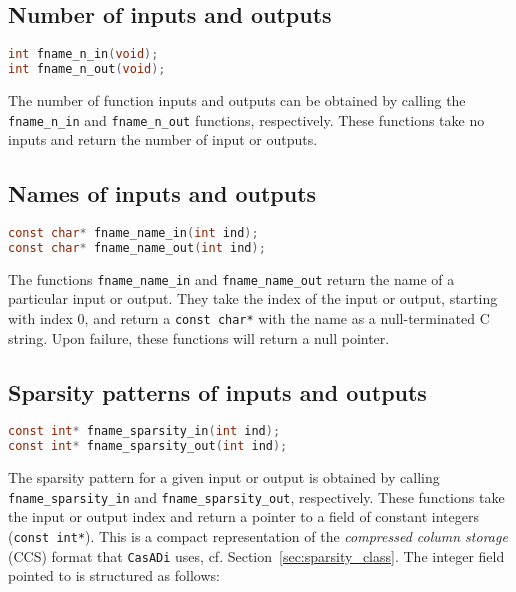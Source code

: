 \documentclass[a4paper,12pt]{book}
\newcommand{\CasADi}{\texttt{CasADi}\xspace}
\begin{document}
\subsection*{Number of inputs and outputs}
\begin{lstlisting}[language=C]
int fname_n_in(void);
int fname_n_out(void);
\end{lstlisting}

The number of function inputs and outputs can be obtained by calling the
\verb|fname_n_in| and \verb|fname_n_out| functions, respectively. These functions
take no inputs and return the number of input or outputs.

\subsection*{Names of inputs and outputs}
\begin{lstlisting}[language=C]
const char* fname_name_in(int ind);
const char* fname_name_out(int ind);
\end{lstlisting}

The functions \verb|fname_name_in| and \verb|fname_name_out| return the name
of a particular input or output. They take the index of the input or output,
starting with index 0, and return a \verb|const char*| with the name as a
null-terminated C string. Upon failure, these functions will return a null
pointer.

\subsection*{Sparsity patterns of inputs and outputs}
\begin{lstlisting}[language=C]
const int* fname_sparsity_in(int ind);
const int* fname_sparsity_out(int ind);
\end{lstlisting}

The sparsity pattern for a given input or output is obtained by calling
\verb|fname_sparsity_in| and \verb|fname_sparsity_out|, respectively.
These functions take the input or output index and return a pointer to a field
of constant integers (\verb|const int*|). This is a compact representation
of the \emph{compressed column storage} (CCS) format that \CasADi uses,
cf. Section~\ref{sec:sparsity_class}.
The integer field pointed to is structured as follows:
\end{document}
